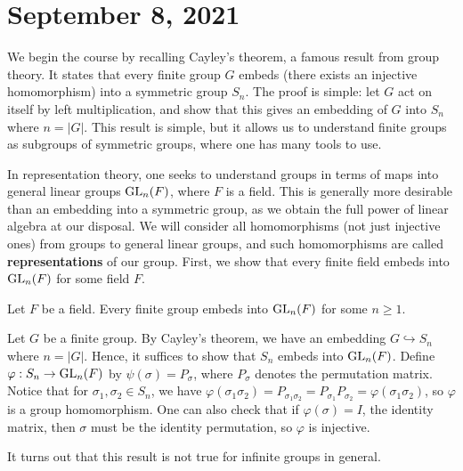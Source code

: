 \section{September 8, 2021}

We begin the course by recalling Cayley's theorem, a famous result from group theory. It states that 
every finite group $G$ embeds (there exists an injective homomorphism) into a symmetric group $S_n$. 
The proof is simple: let $G$ act on itself by left multiplication, and show that this gives an 
embedding of $G$ into $S_n$ where $n = |G|$. This result is simple, but it allows us to understand 
finite groups as subgroups of symmetric groups, where one has many tools to use. 

In representation theory, one seeks to understand groups in terms of maps into general linear groups 
$\operatorname{GL}_n(F)$, where $F$ is a field. This is generally more desirable than an embedding into 
a symmetric group, as we obtain the full power of linear algebra at our disposal. We will consider 
all homomorphisms (not just injective ones) from groups to general linear groups, and such 
homomorphisms are called {\bf representations} of our group. First, we show that 
every finite field embeds into $\operatorname{GL}_n(F)$ for some field $F$.

\begin{prop}
Let $F$ be a field. Every finite group embeds into $\operatorname{GL}_n(F)$ for some $n \geq 1$. 
\end{prop}
\begin{pf}
Let $G$ be a finite group. By Cayley's theorem, we have an embedding $G \hookrightarrow S_n$ 
where $n = |G|$. Hence, it suffices to show that $S_n$ embeds into $\operatorname{GL}_n(F)$. Define 
$\varphi : S_n \to \operatorname{GL}_n(F)$ by $\psi(\sigma) = P_\sigma$, where $P_\sigma$ denotes the permutation matrix. Notice that for $\sigma_1, \sigma_2 \in S_n$, we have $\varphi(\sigma_1\sigma_2) 
= P_{\sigma_1\sigma_2} = P_{\sigma_1}P_{\sigma_2} = \varphi(\sigma_1\sigma_2)$, so $\varphi$ is a 
group homomorphism. One can also check that if $\varphi(\sigma) = I$, the identity matrix, then 
$\sigma$ must be the identity permutation, so $\varphi$ is injective.
\end{pf}

It turns out that this result is not true for infinite groups in general. 

